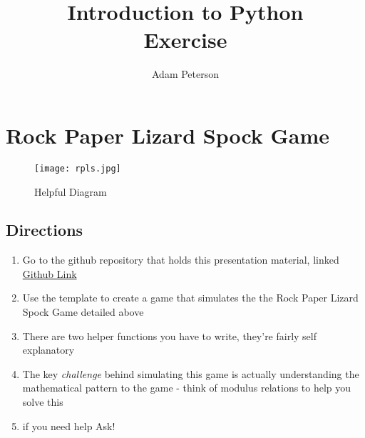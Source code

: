 \documentclass{article}
\title{Introduction to Python\\
	\Large{Exercise}}
\author{Adam Peterson}
\begin{document}
	\maketitle

\section{Rock Paper Lizard Spock Game}

	\begin{figure}[h]
		\centering
		\texttt{[image: rpls.jpg]}
		\caption{Helpful Diagram}
		\label{fig: RPLS}
	\end{figure}
	
	\subsection{Directions}
	\begin{enumerate}
		\item  Go to the github repository that holds this presentation material, linked \href{https://github.com/apeterson91/computing_workshops/tree/master/workshop_1}{Github Link}
		\item Use the template to create a game that simulates the the Rock Paper Lizard Spock Game detailed above
		\item There are two helper functions you have to write, they're fairly self explanatory
		\item The key \textit{challenge} behind simulating this game is actually understanding the mathematical pattern to the game - think of modulus relations to help you solve this
		\item if you need help Ask! 
	\end{enumerate}
\end{document}
